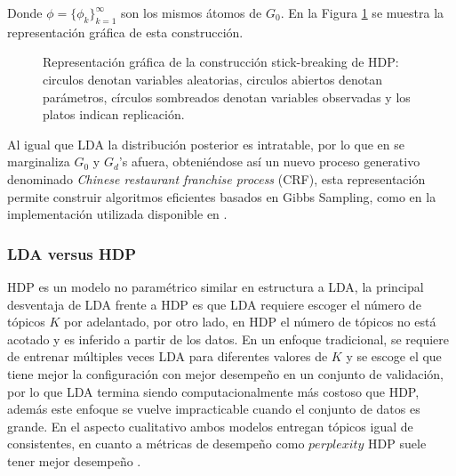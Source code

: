 \documentclass[letterpaper,12pt,oneside]{book} %
\begin{document}
Donde $\phi = \{\phi_{k}\}_{k=1}^{\infty}$ son los mismos átomos de $G_{0}$. En la Figura \ref{img:hdp_sbc} se muestra la representación gráfica de esta construcción.

\begin{figure}
  \centering
\caption{Representación gráfica de la construcción stick-breaking de HDP: circulos denotan variables aleatorias, circulos abiertos denotan parámetros, círculos sombreados denotan variables observadas y los platos indican replicación.}
\label{img:hdp_sbc}
\end{figure}

Al igual que LDA la distribución posterior es intratable, por lo que en \citep{teh2005sharing} se marginaliza $G_{0}$ y $G_{d}$'s afuera, obteniéndose así un nuevo proceso generativo denominado \textit{Chinese restaurant franchise process} (CRF), esta representación permite construir algoritmos eficientes basados en Gibbs Sampling, como en la implementación utilizada disponible en \citep{HDP}.

\subsubsection{LDA versus HDP}
HDP es un modelo no paramétrico similar en estructura a LDA, la principal desventaja de LDA frente a HDP es que LDA requiere escoger el número de tópicos $K$ por adelantado, por otro lado, en HDP el número de tópicos no está acotado y es inferido a partir de los datos. En un enfoque tradicional, se requiere de entrenar múltiples veces LDA para diferentes valores de $K$ y se escoge el que tiene mejor la configuración con mejor desempeño en un conjunto de validación, por lo que LDA termina siendo computacionalmente más costoso que HDP, además este enfoque se vuelve impracticable cuando el conjunto de datos es grande. En el aspecto cualitativo ambos modelos entregan tópicos igual de consistentes, en cuanto a métricas de desempeño como $\textit{perplexity}$ HDP suele tener mejor desempeño \citep{teh2005sharing}.
\end{document}
